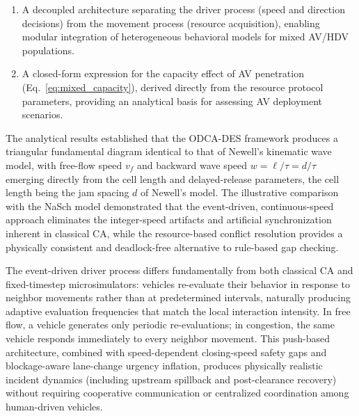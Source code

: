 \documentclass[review,number]{elsarticle}
\begin{document}
\begin{enumerate}
    \item A decoupled architecture separating the driver process (speed and direction decisions) from the movement process (resource acquisition), enabling modular integration of heterogeneous behavioral models for mixed AV/HDV populations.

    \item A closed-form expression for the capacity effect of AV penetration (Eq.~\ref{eq:mixed_capacity}), derived directly from the resource protocol parameters, providing an analytical basis for assessing AV deployment scenarios.
\end{enumerate}

The analytical results established that the ODCA-DES framework produces a triangular fundamental diagram identical to that of Newell's kinematic wave model, with free-flow speed $v_f$ and backward wave speed $w = \ell/\tau = d/\tau$ emerging directly from the cell length and delayed-release parameters, the cell length being the jam spacing $d$ of Newell's model. The illustrative comparison with the NaSch model demonstrated that the event-driven, continuous-speed approach eliminates the integer-speed artifacts and artificial synchronization inherent in classical CA, while the resource-based conflict resolution provides a physically consistent and deadlock-free alternative to rule-based gap checking.

The event-driven driver process differs fundamentally from both classical CA and fixed-timestep microsimulators: vehicles re-evaluate their behavior in response to neighbor movements rather than at predetermined intervals, naturally producing adaptive evaluation frequencies that match the local interaction intensity. In free flow, a vehicle generates only periodic re-evaluations; in congestion, the same vehicle responds immediately to every neighbor movement. This push-based architecture, combined with speed-dependent closing-speed safety gaps and blockage-aware lane-change urgency inflation, produces physically realistic incident dynamics (including upstream spillback and post-clearance recovery) without requiring cooperative communication or centralized coordination among human-driven vehicles.
\end{document}
